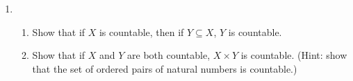 {\begin{enumerate}
\item \begin{enumerate}
	\item Show that if $X$ is countable, then if $Y \subseteq X$, $Y$ is countable.
\item Show that if $X$ and $Y$ are both countable, $X \times Y$ is countable. (Hint: show that the set of ordered pairs of natural numbers is countable.)

\end{enumerate}





\end{enumerate}
}

